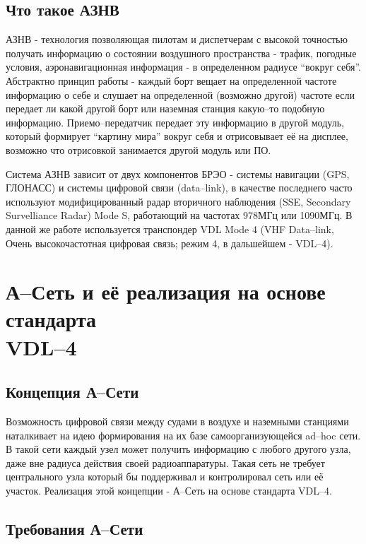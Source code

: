 \documentclass[a4paper,12pt]{report} %
\begin{document}
\section{Что такое АЗНВ}

АЗНВ - технология позволяющая пилотам и диспетчерам с высокой точностью получать
информацию о состоянии воздушного пространства - трафик, погодные условия,
аэронавигационная информация - в определенном радиусе ``вокруг себя''.
Абстрактно принцип работы - каждый борт вещает на определенной частоте информацию о себе и
слушает на определенной (возможно другой) частоте если передает ли какой другой
борт или наземная станция какую--то подобную информацию. Приемо--передатчик
передает эту информацию в другой модуль, который формирует ``картину мира''
вокруг себя и отрисовывает её на дисплее, возможно что отрисовкой занимается
другой модуль или ПО.

Система АЗНВ зависит от двух компонентов БРЭО - системы навигации (GPS, ГЛОНАСС)
и системы цифровой связи (data--link), в качестве последнего часто используют
модифицированный радар вторичного наблюдения (SSE, Secondary Survelliance Radar)
Mode S, работающий на частотах 978МГц или 1090МГц. В данной же работе
используется транспондер VDL Mode 4 (VHF Data--link, Очень высокочастотная цифровая
связь; режим 4, в дальшейшем - VDL--4).
\newpage

\chapter{А--Сеть и её реализация на основе стандарта \\
 VDL--4} %

\section{Концепция А--Сети}

Возможность цифровой связи между судами в воздухе и наземными станциями
наталкивает на идею формирования на их базе самоорганизующейся ad--hoc сети. В
такой сети каждый узел может получить информацию с любого другого узла, даже вне
радиуса действия своей радиоаппаратуры. Такая сеть не требует центрального узла
который бы поддерживал и контролировал сеть или её участок. Реализация этой
концепции - А--Сеть на основе стандарта VDL--4. \cite{theconcept}

\section{Требования А--Сети}
\end{document}
